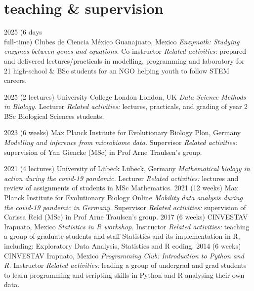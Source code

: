 \documentclass[]{friggeri-cv} %
\begin{document}

\section{teaching \& supervision}

\begin{entrylist}
\entry
{2025}
{(6 days\\ full-time)}
{Clubes de Ciencia México}
{Guanajuato, Mexico}
{{\normalsize\emph{Enzymath: Studying enzymes between genes and equations.} Co-instructor}}
{\emph{Related activities:} prepared and delivered lectures/practicals in modelling, programming and laboratory for 21 high-school \& BSc students for an NGO helping youth to follow STEM careers.
}
\end{entrylist}
\begin{entrylist}
\entry
{2025}
{(2 lectures)}
{University College London}
{London, UK}
{{\normalsize\emph{Data Science Methods in Biology.} Lecturer}}
{\emph{Related activities:} lectures, practicals, and grading of year 2 BSc Biological Sciences students.
}
\end{entrylist}
\begin{entrylist}
\entry
{2023}
{(6 weeks)}
{Max Planck Institute for Evolutionary Biology}
{Plön, Germany}
{{\normalsize\emph{Modelling and inference from microbiome data.} Supervisor}}
{\emph{Related activities:} supervision of Yan Giencke (MSc) in Prof Arne Traulsen's group.}
\end{entrylist}
\begin{entrylist}
\entry
{2021}
{(4 lectures)}
{University of Lübeck}
{Lübeck, Germany}
{{\normalsize\emph{Mathematical biology in action during the covid-19 pandemic.} Lecturer}}
{\emph{Related activities:} lectures and review of assignments of students in MSc Mathematics.}
\entry
{2021}
{(12 weeks)}
{Max Planck Institute for Evolutionary Biology}
{Online}
{{\normalsize\emph{Mobility data analysis during the covid-19 pandemic in Germany.} Supervisor}}
{\emph{Related activities:} supervision of Carissa Reid (MSc) in Prof Arne Traulsen's group.}
\entry
{2017}
{(6 weeks)}
{CINVESTAV}
{Irapuato, Mexico}
{{\normalsize\emph{Statistics in R workshop.} Instructor}}
{\emph{Related activities:} teaching a group of graduate students and staff Statistics and its implementation in R, including: Exploratory Data Analysis, Statistics and R coding.}
\entry
{2014}
{(6 weeks)}
{CINVESTAV}
{Irapuato, Mexico}
{{\normalsize\emph{Programming Club: Introduction to Python and R.} Instructor}}
{\emph{Related activities:} leading a group of undergrad and grad students to learn programming and scripting skills in Python and R analysing their own data.}
\end{entrylist}
\end{document}
